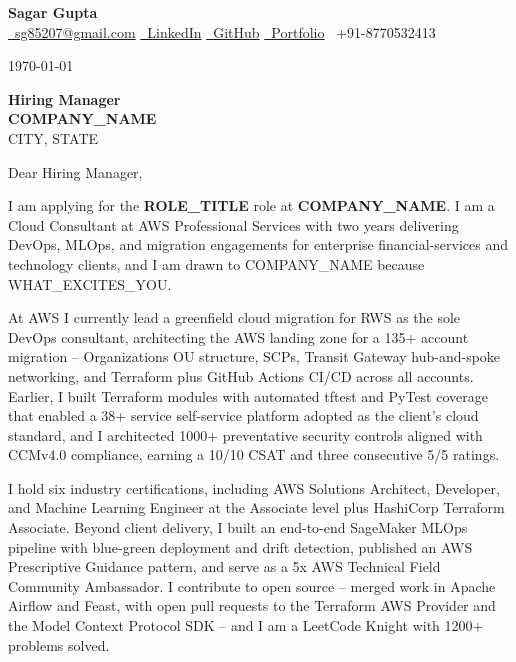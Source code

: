 \documentclass[a4paper,11pt]{article}
\begin{document}
\noindent
\textbf{\Large Sagar Gupta} \\[2pt]
\small{%
\href{mailto:sg85207@gmail.com}{\faSend\ sg85207@gmail.com} \hspace{2mm}
\href{https://www.linkedin.com/in/sagar-gupta-16-10/}{\faLinkedinSquare\ LinkedIn} \hspace{2mm}
\href{https://github.com/Sagargupta16}{\faGithub\ GitHub} \hspace{2mm}
\href{https://sagargupta.online/portfolio-react/}{\faGlobe\ Portfolio} \hspace{2mm}
\faPhone\ +91-8770532413
}

\vspace{6mm}
\noindent
\today

\vspace{4mm}
\noindent
\textbf{Hiring Manager} \\
\textbf{COMPANY\_NAME} \\
CITY, STATE

\vspace{6mm}
\noindent
Dear Hiring Manager,

\vspace{3mm}
\noindent
I am applying for the \textbf{ROLE\_TITLE} role at \textbf{COMPANY\_NAME}. I am a Cloud Consultant at AWS Professional Services with two years delivering DevOps, MLOps, and migration engagements for enterprise financial-services and technology clients, and I am drawn to COMPANY\_NAME because WHAT\_EXCITES\_YOU.

\vspace{3mm}
\noindent
At AWS I currently lead a greenfield cloud migration for RWS as the sole DevOps consultant, architecting the AWS landing zone for a 135+ account migration -- Organizations OU structure, SCPs, Transit Gateway hub-and-spoke networking, and Terraform plus GitHub Actions CI/CD across all accounts. Earlier, I built Terraform modules with automated tftest and PyTest coverage that enabled a 38+ service self-service platform adopted as the client's cloud standard, and I architected 1000+ preventative security controls aligned with CCMv4.0 compliance, earning a 10/10 CSAT and three consecutive 5/5 ratings.

\vspace{3mm}
\noindent
I hold six industry certifications, including AWS Solutions Architect, Developer, and Machine Learning Engineer at the Associate level plus HashiCorp Terraform Associate. Beyond client delivery, I built an end-to-end SageMaker MLOps pipeline with blue-green deployment and drift detection, published an AWS Prescriptive Guidance pattern, and serve as a 5x AWS Technical Field Community Ambassador. I contribute to open source -- merged work in Apache Airflow and Feast, with open pull requests to the Terraform AWS Provider and the Model Context Protocol SDK -- and I am a LeetCode Knight with 1200+ problems solved.
\end{document}
